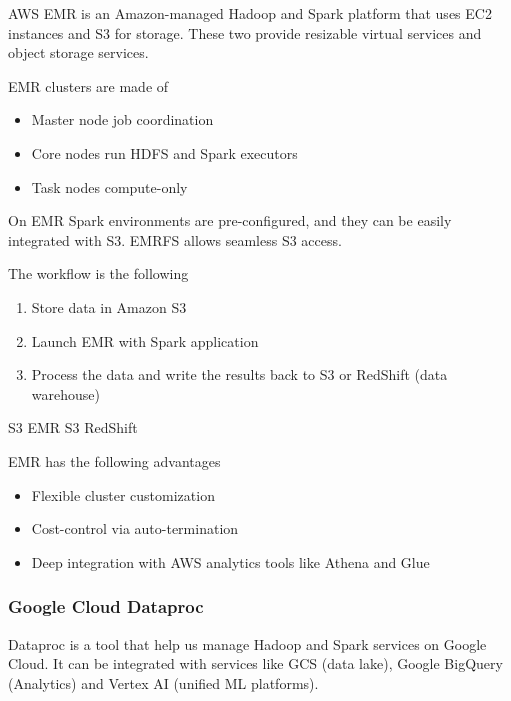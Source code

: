 AWS EMR is an Amazon-managed Hadoop and Spark platform that uses EC2 instances and S3 for storage. These two provide resizable virtual services and object storage services. 

\vspace{10pt}

EMR clusters are made of

\begin{itemize}
    \item Master node \ra job coordination
    \item Core nodes \ra run HDFS and Spark executors
    \item Task nodes \ra compute-only 
\end{itemize}

On EMR Spark environments are pre-configured, and they can be easily integrated with S3. EMRFS allows seamless S3 access.

\vspace{10pt}

The workflow is the following
\begin{enumerate}
    \item Store data in Amazon S3
    \item Launch EMR with Spark application
    \item Process the data and write the results back to S3 or RedShift (data warehouse)
\end{enumerate}

S3 \ra EMR \ra S3 \ra RedShift

\vspace{10pt}

EMR has the following advantages

\begin{itemize}
    \item Flexible cluster customization
    \item Cost-control via auto-termination
    \item Deep integration with AWS analytics tools like Athena and Glue
\end{itemize}


\subsubsection{Google Cloud Dataproc}

Dataproc is a tool that help us manage Hadoop and Spark services on Google Cloud. It can be integrated with services like GCS (data lake), Google BigQuery (Analytics) and Vertex AI (unified ML platforms).

